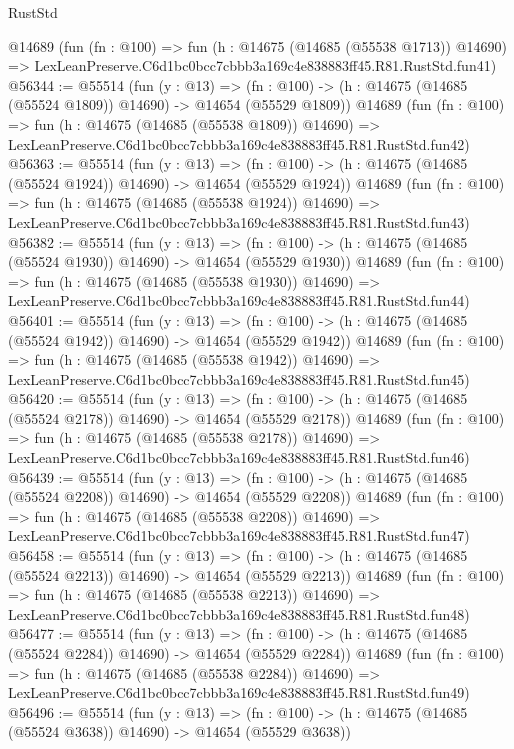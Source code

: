 \begin{lexlean}{RustStd}
\begin{coremodule}
    @14689
    (fun (fn : @100) =>
    fun (h : @14675 (@14685 (@55538 @1713)) @14690) =>
    LexLeanPreserve.C6d1bc0bcc7cbbb3a169c4e838883ff45.R81.RustStd.fun41)
@56344 := @55514
    (fun (y : @13) =>
    (fn : @100) -> (h : @14675 (@14685 (@55524 @1809)) @14690) -> @14654 (@55529 @1809))
    @14689
    (fun (fn : @100) =>
    fun (h : @14675 (@14685 (@55538 @1809)) @14690) =>
    LexLeanPreserve.C6d1bc0bcc7cbbb3a169c4e838883ff45.R81.RustStd.fun42)
@56363 := @55514
    (fun (y : @13) =>
    (fn : @100) -> (h : @14675 (@14685 (@55524 @1924)) @14690) -> @14654 (@55529 @1924))
    @14689
    (fun (fn : @100) =>
    fun (h : @14675 (@14685 (@55538 @1924)) @14690) =>
    LexLeanPreserve.C6d1bc0bcc7cbbb3a169c4e838883ff45.R81.RustStd.fun43)
@56382 := @55514
    (fun (y : @13) =>
    (fn : @100) -> (h : @14675 (@14685 (@55524 @1930)) @14690) -> @14654 (@55529 @1930))
    @14689
    (fun (fn : @100) =>
    fun (h : @14675 (@14685 (@55538 @1930)) @14690) =>
    LexLeanPreserve.C6d1bc0bcc7cbbb3a169c4e838883ff45.R81.RustStd.fun44)
@56401 := @55514
    (fun (y : @13) =>
    (fn : @100) -> (h : @14675 (@14685 (@55524 @1942)) @14690) -> @14654 (@55529 @1942))
    @14689
    (fun (fn : @100) =>
    fun (h : @14675 (@14685 (@55538 @1942)) @14690) =>
    LexLeanPreserve.C6d1bc0bcc7cbbb3a169c4e838883ff45.R81.RustStd.fun45)
@56420 := @55514
    (fun (y : @13) =>
    (fn : @100) -> (h : @14675 (@14685 (@55524 @2178)) @14690) -> @14654 (@55529 @2178))
    @14689
    (fun (fn : @100) =>
    fun (h : @14675 (@14685 (@55538 @2178)) @14690) =>
    LexLeanPreserve.C6d1bc0bcc7cbbb3a169c4e838883ff45.R81.RustStd.fun46)
@56439 := @55514
    (fun (y : @13) =>
    (fn : @100) -> (h : @14675 (@14685 (@55524 @2208)) @14690) -> @14654 (@55529 @2208))
    @14689
    (fun (fn : @100) =>
    fun (h : @14675 (@14685 (@55538 @2208)) @14690) =>
    LexLeanPreserve.C6d1bc0bcc7cbbb3a169c4e838883ff45.R81.RustStd.fun47)
@56458 := @55514
    (fun (y : @13) =>
    (fn : @100) -> (h : @14675 (@14685 (@55524 @2213)) @14690) -> @14654 (@55529 @2213))
    @14689
    (fun (fn : @100) =>
    fun (h : @14675 (@14685 (@55538 @2213)) @14690) =>
    LexLeanPreserve.C6d1bc0bcc7cbbb3a169c4e838883ff45.R81.RustStd.fun48)
@56477 := @55514
    (fun (y : @13) =>
    (fn : @100) -> (h : @14675 (@14685 (@55524 @2284)) @14690) -> @14654 (@55529 @2284))
    @14689
    (fun (fn : @100) =>
    fun (h : @14675 (@14685 (@55538 @2284)) @14690) =>
    LexLeanPreserve.C6d1bc0bcc7cbbb3a169c4e838883ff45.R81.RustStd.fun49)
@56496 := @55514
    (fun (y : @13) =>
    (fn : @100) -> (h : @14675 (@14685 (@55524 @3638)) @14690) -> @14654 (@55529 @3638))

\end{coremodule}
\end{lexlean}
